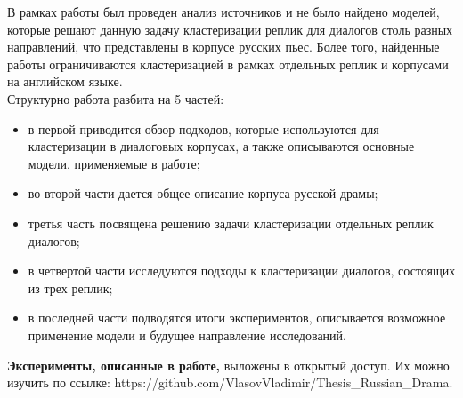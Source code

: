 \documentclass[a4paper,14pt]{article}
\begin{document}
\begin{justify}
\indent 
В рамках работы был проведен анализ источников и не было найдено моделей, которые решают данную задачу кластеризации реплик для диалогов столь разных направлений, что представлены в корпусе русских пьес. Более того, найденные работы ограничиваются кластеризацией в рамках отдельных реплик и корпусами на английском языке. \\
\indent 
Структурно работа разбита на 5 частей: 
\begin{itemize}
  \item в первой приводится обзор подходов, которые используются для кластеризации в диалоговых корпусах, а также описываются основные модели, применяемые в работе; 
   \item во второй части дается общее описание корпуса русской драмы;
   \item третья часть посвящена решению задачи кластеризации отдельных реплик диалогов;
   \item в четвертой части исследуются подходы к кластеризации диалогов, состоящих из трех реплик; 
   \item в последней части подводятся итоги экспериментов, описывается возможное применение модели и будущее направление исследований.
\end{itemize}
\indent 
\textbf{Эксперименты, описанные в работе,} выложены в открытый доступ. Их можно изучить по ссылке: https://github.com/VlasovVladimir/Thesis\_Russian\_Drama.\\

\end{justify}
\pagebreak
\end{document}
